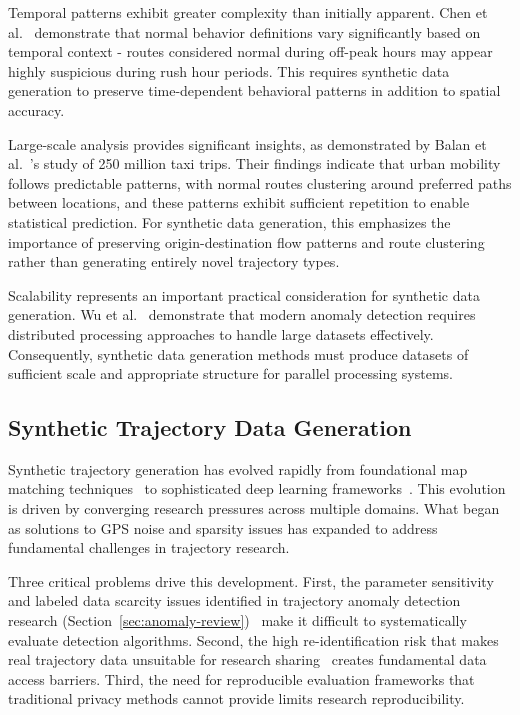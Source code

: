 \documentclass[runningheads]{llncs}
\begin{document}
Temporal patterns exhibit greater complexity than initially apparent. Chen et al.~\cite{chenTemporalContextAwareRoute2021} demonstrate that normal behavior definitions vary significantly based on temporal context - routes considered normal during off-peak hours may appear highly suspicious during rush hour periods. This requires synthetic data generation to preserve time-dependent behavioral patterns in addition to spatial accuracy.

Large-scale analysis provides significant insights, as demonstrated by Balan et al.~\cite{balanRealTimeTripInformation2011}'s study of 250 million taxi trips. Their findings indicate that urban mobility follows predictable patterns, with normal routes clustering around preferred paths between locations, and these patterns exhibit sufficient repetition to enable statistical prediction. For synthetic data generation, this emphasizes the importance of preserving origin-destination flow patterns and route clustering rather than generating entirely novel trajectory types.

Scalability represents an important practical consideration for synthetic data generation. Wu et al.~\cite{wuSafetySpatialFeature2024} demonstrate that modern anomaly detection requires distributed processing approaches to handle large datasets effectively. Consequently, synthetic data generation methods must produce datasets of sufficient scale and appropriate structure for parallel processing systems.

\subsection{Synthetic Trajectory Data Generation}
\label{sec:generation-review}

Synthetic trajectory generation has evolved rapidly from foundational map matching techniques~\cite{newsonHiddenMarkovMap2009} to sophisticated deep learning frameworks~\cite{caoGeneratingMobilityTrajectories2021,wangGTGGeneralizableTrajectory2025}. This evolution is driven by converging research pressures across multiple domains. What began as solutions to GPS noise and sparsity issues has expanded to address fundamental challenges in trajectory research.

Three critical problems drive this development. First, the parameter sensitivity and labeled data scarcity issues identified in trajectory anomaly detection research (Section~\ref{sec:anomaly-review})~\cite{zhangIBATDetectingAnomalous2011} make it difficult to systematically evaluate detection algorithms. Second, the high re-identification risk that makes real trajectory data unsuitable for research sharing~\cite{raoCATSConditionalAdversarial2023} creates fundamental data access barriers. Third, the need for reproducible evaluation frameworks that traditional privacy methods cannot provide limits research reproducibility.
\end{document}
